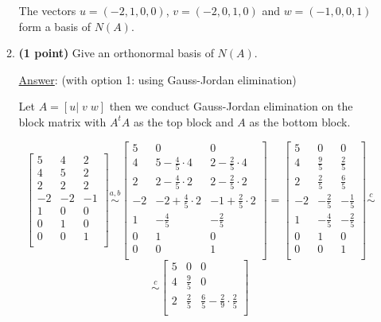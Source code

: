 \documentclass[]{book}
\theoremstyle{definition}
\newcommand\ans{\underline{Answer}: }
\begin{document}
\begin{enumerate}
\begin{enumerate}
The vectors $u=(-2,1,0,0)$, $v=(-2,0,1,0)$ and $w=(-1,0,0,1)$ form a basis of $N(A)$.


\item {\bf (1 point)} Give an orthonormal basis of $N(A)$.

\ans (with option 1: using Gauss-Jordan elimination)

Let $A=[u|\; v\; w]$ then we conduct Gauss-Jordan elimination on the block matrix with $A^tA$ as the top block and $A$ as the bottom block.

\[
{\begin{bmatrix}
5 & 4 & 2\\
4 & 5 & 2 \\
2 & 2 & 2 \\

-2 & -2 & -1\\
1 & 0 & 0 \\
0 & 1 & 0 \\
0 & 0 & 1 \\
\end{bmatrix}
}
\stackrel{a,b}{\sim}
{\begin{bmatrix}
5 & 0 & 0\\
4 & 5 - \frac{4}{5}\cdot4 & 2 - \frac{2}{5}\cdot4 \\
2 & 2 - \frac{4}{5}\cdot2 & 2 - \frac{2}{5}\cdot2 \\

-2 & -2 + \frac{4}{5}\cdot2  & -1 + \frac{2}{5}\cdot2 \\
1 & -\frac{4}{5} & -\frac{2}{5} \\
0 & 1 & 0 \\
0 & 0 & 1 \\
\end{bmatrix}
}
=
{\begin{bmatrix}
5 & 0 & 0\\
4 & \frac{9}{5} & \frac{2}{5} \\
2 & \frac{2}{5} & \frac{6}{5} \\

-2 & -\frac{2}{5} & -\frac{1}{5}\\
1 & -\frac{4}{5} & -\frac{2}{5} \\
0 & 1 & 0 \\
0 & 0 & 1 \\
\end{bmatrix}
\stackrel{c}{\sim}
}
\]
\[
\stackrel{c}{\sim}
{\begin{bmatrix}
5 & 0 & 0\\
4 & \frac{9}{5} & 0 \\
2 & \frac{2}{5} & \frac{6}{5} - \frac{2}{9}\cdot\frac{2}{5} \\


\end{bmatrix}}\]
\end{enumerate}
\end{enumerate}
\end{document}

